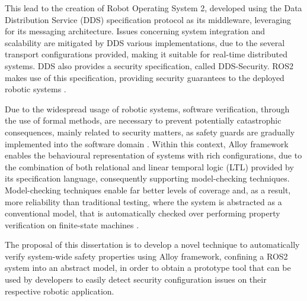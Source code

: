 This lead to the creation of Robot Operating System 2, developed using the Data Distribution Service (DDS) \cite{3} specification protocol as its middleware, leveraging for its messaging architecture. Issues concerning system integration and scalability are mitigated by DDS various implementations, due to the several transport configurations provided, making it suitable for real-time distributed systems. DDS also provides a security specification, called DDS-Security. ROS2 makes use of this specification, providing security guarantees to the deployed robotic systems \cite{8442103}.

Due to the widespread usage of robotic systems, software verification, through the use of formal methods, are necessary to prevent potentially catastrophic consequences, mainly related to security matters, as safety guards are gradually implemented into the software domain \cite{wu2017safety}. Within this context, Alloy \cite{alloy-DJ, lwspecification} framework enables the behavioural representation of systems with rich configurations, due to the combination of both relational and linear temporal logic (LTL) provided by its specification language, consequently supporting model-checking techniques. Model-checking techniques enable far better levels of coverage and, as a result, more reliability than traditional testing, where the system is abstracted as a conventional model, that is automatically checked over performing property verification on finite-state machines \cite{beyer2017software}.


The proposal of this dissertation is to develop a novel technique to automatically verify system-wide safety properties using Alloy framework, confining a ROS2 system into an abstract model, in order to obtain a prototype tool that can be used by developers to easily detect security configuration issues on their respective robotic application.



